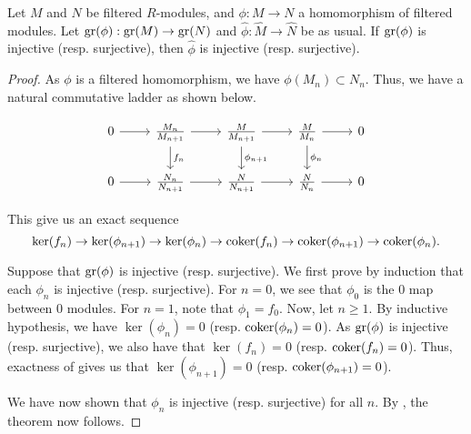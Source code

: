 \begin{prop} \label{prop:gr-injective-implies-completion-injective}
	Let $M$ and $N$ be filtered $R$-modules, and $\phi : M \to N$ a homomorphism of filtered modules. \newline
	Let $\operatorname{gr}(\phi) : \operatorname{gr}(M) \to \operatorname{gr}(N)$ and $\widehat{\phi} : \widehat{M} \to \widehat{N}$ be as usual. \newline
	If $\operatorname{gr}(\phi)$ is injective (resp. surjective), then $\widehat{\phi}$ is injective (resp. surjective).
\end{prop}
\begin{proof} 
	As $\phi$ is a filtered homomorphism, we have $\phi(M_{n}) \subset N_{n}$. Thus, we have a natural commutative ladder as shown below.

	\begin{equation*} 
		\begin{tikzcd}
			0 \arrow[r] & \frac{M_{n}}{M_{n + 1}} \arrow[r] \arrow[d, "f_{n}"] & \frac{M}{M_{n + 1}} \arrow[r] \arrow[d, "\phi_{n + 1}"] & \frac{M}{M_{n}} \arrow[r] \arrow[d, "\phi_{n}"] & 0 \\
			0 \arrow[r] & \frac{N_{n}}{N_{n + 1}} \arrow[r] & \frac{N}{N_{n + 1}} \arrow[r] & \frac{N}{N_{n}} \arrow[r] & 0
		\end{tikzcd}
	\end{equation*}

	This give us an exact sequence
	\begin{equation} \label{eq:11}
		\ker(f_{n}) \to \ker(\phi_{n + 1}) \to \ker(\phi_{n}) \to \operatorname{coker}(f_{n}) \to \operatorname{coker}(\phi_{n + 1}) \to \operatorname{coker}(\phi_{n}).
	\end{equation}

	Suppose that $\operatorname{gr}(\phi)$ is injective (resp. surjective). We first prove by induction that each $\phi_{n}$ is injective (resp. surjective). For $n = 0$, we see that $\phi_{0}$ is the $0$ map between $0$ modules. For $n = 1$, note that $\phi_{1} = f_{0}$. Now, let $n \ge 1$. By inductive hypothesis, we have $\ker(\phi_{n}) = 0$ (resp. $\operatorname{coker}(\phi_{n}) = 0$). As $\operatorname{gr}(\phi)$ is injective (resp. surjective), we also have that $\ker(f_{n}) = 0$ (resp. $\operatorname{coker}(f_{n}) = 0$). Thus, exactness of  gives us that $\ker(\phi_{n + 1}) = 0$ (resp. $\operatorname{coker}(\phi_{n + 1}) = 0$). 

	We have now shown that $\phi_{n}$ is injective (resp. surjective) for all $n$. By , the theorem now follows.
\end{proof}

